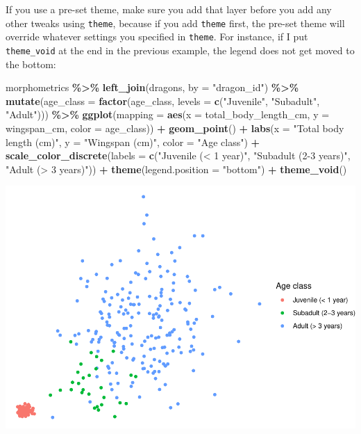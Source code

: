 \documentclass[
]{book}
\newenvironment{Shaded}{\begin{snugshade}}{\end{snugshade}}
\newcommand{\AttributeTok}[1]{\textcolor[rgb]{0.13,0.29,0.53}{#1}}
\newcommand{\FunctionTok}[1]{\textcolor[rgb]{0.13,0.29,0.53}{\textbf{#1}}}
\newcommand{\NormalTok}[1]{#1}
\newcommand{\SpecialCharTok}[1]{\textcolor[rgb]{0.81,0.36,0.00}{\textbf{#1}}}
\newcommand{\StringTok}[1]{\textcolor[rgb]{0.31,0.60,0.02}{#1}}
\begin{document}
If you use a pre-set theme, make sure you add that layer before you add any
other tweaks using \texttt{theme}, because if you add \texttt{theme} first, the pre-set theme
will override whatever settings you specified in \texttt{theme}. For instance, if I put
\texttt{theme\_void} at the end in the previous example, the legend does not get moved
to the bottom:

\begin{Shaded}
\begin{Highlighting}[]
\NormalTok{morphometrics }\SpecialCharTok{\%\textgreater{}\%} 
  \FunctionTok{left\_join}\NormalTok{(dragons, }\AttributeTok{by =} \StringTok{"dragon\_id"}\NormalTok{) }\SpecialCharTok{\%\textgreater{}\%} 
  \FunctionTok{mutate}\NormalTok{(}\AttributeTok{age\_class =} \FunctionTok{factor}\NormalTok{(age\_class, }\AttributeTok{levels =} \FunctionTok{c}\NormalTok{(}\StringTok{"Juvenile"}\NormalTok{,}
                                                  \StringTok{"Subadult"}\NormalTok{,}
                                                  \StringTok{"Adult"}\NormalTok{))) }\SpecialCharTok{\%\textgreater{}\%} 
\FunctionTok{ggplot}\NormalTok{(}\AttributeTok{mapping =} \FunctionTok{aes}\NormalTok{(}\AttributeTok{x =}\NormalTok{ total\_body\_length\_cm, }\AttributeTok{y =}\NormalTok{ wingspan\_cm, }\AttributeTok{color =}\NormalTok{ age\_class)) }\SpecialCharTok{+}
  \FunctionTok{geom\_point}\NormalTok{() }\SpecialCharTok{+}
  \FunctionTok{labs}\NormalTok{(}\AttributeTok{x =} \StringTok{"Total body length (cm)"}\NormalTok{, }\AttributeTok{y =} \StringTok{"Wingspan (cm)"}\NormalTok{, }\AttributeTok{color =} \StringTok{"Age class"}\NormalTok{) }\SpecialCharTok{+}
  \FunctionTok{scale\_color\_discrete}\NormalTok{(}\AttributeTok{labels =} \FunctionTok{c}\NormalTok{(}\StringTok{"Juvenile (\textless{} 1 year)"}\NormalTok{,}
                                 \StringTok{"Subadult (2{-}3 years)"}\NormalTok{,}
                                 \StringTok{"Adult (\textgreater{} 3 years)"}\NormalTok{)) }\SpecialCharTok{+}
  \FunctionTok{theme}\NormalTok{(}\AttributeTok{legend.position =} \StringTok{"bottom"}\NormalTok{) }\SpecialCharTok{+}
  \FunctionTok{theme\_void}\NormalTok{() }
\end{Highlighting}
\end{Shaded}

\includegraphics{reproducible-science_files/figure-latex/gg16-1.pdf}
\end{document}
